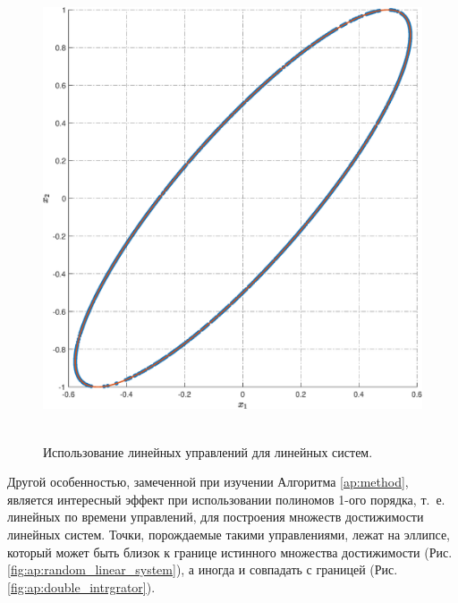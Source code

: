 \documentclass[../main.tex]{subfiles}
\begin{document}
\begin{figure}[ht!]
\begin{minipage}[b]{.4\linewidth}
 		\includegraphics[width=\linewidth]{images/double_integrator_linear_control.eps}
 		 \label{fig:ap:double_intrgrator} 
 	\end{minipage} 
 	\caption{Использование линейных управлений для линейных систем.}\label{fig:ap:linear_control}
 \end{figure}
 
 Другой особенностью, замеченной при изучении Алгоритма \ref{ap:method}, является интересный эффект при использовании полиномов 1-ого порядка, т.~е. линейных по времени управлений, для построения множеств достижимости линейных систем.
 Точки, порождаемые такими управлениями, лежат на эллипсе, который может быть близок к границе истинного множества достижимости (Рис. \ref{fig:ap:random_linear_system}), а иногда и совпадать с границей (Рис. \ref{fig:ap:double_intrgrator}). 
 
\end{document}
